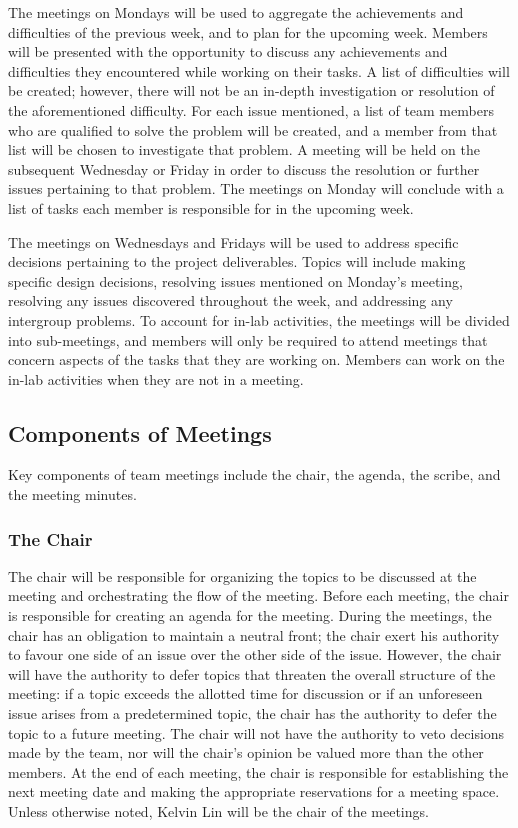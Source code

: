 \documentclass{article}
\begin{document}
The meetings on Mondays will be used to aggregate the achievements and 
difficulties of the previous week, and to plan for the upcoming week. Members 
will be presented with the opportunity to discuss any achievements and 
difficulties they encountered while working on their tasks. A list of 
difficulties 
will be created; however, there will not be an in-depth investigation or 
resolution of the aforementioned difficulty. For each issue mentioned, a list of 
team members who are qualified to solve the problem will be created, and a 
member from that list will be chosen to investigate that problem. A meeting will 
be held on the subsequent Wednesday or Friday in order to discuss the resolution 
or further issues pertaining to that problem. The meetings on Monday will 
conclude with a list of tasks each member is responsible for in the upcoming 
week.

The meetings on Wednesdays and Fridays will be used to address specific 
decisions pertaining to the project deliverables. Topics will include making 
specific design decisions, resolving issues mentioned on Monday's meeting, 
resolving any issues discovered throughout the week, and addressing any 
intergroup problems. To account for in-lab activities, the meetings will be 
divided into sub-meetings, and members will only be required to attend meetings 
that concern aspects of the tasks that they are working on. Members can work on 
the in-lab activities when they are not in a meeting. 

\subsection{Components of Meetings}
Key components of team meetings include the chair, the agenda, the scribe, and 
the meeting minutes.

\subsubsection{The Chair}
The chair will be responsible for organizing the topics to be discussed at the 
meeting and orchestrating the flow of the meeting. Before each meeting, the 
chair is responsible for creating an agenda for the meeting. During the 
meetings, the chair has an obligation to maintain a neutral front; the chair 
exert his authority to favour one side of an issue over the other side of the 
issue. However, the chair will have the authority to defer topics that threaten 
the overall structure of the meeting: if a topic exceeds the allotted time for 
discussion or if an unforeseen issue arises from a predetermined topic, the 
chair has the authority to defer the topic to a future meeting. The chair will 
not have the authority to veto decisions made by the team, nor will the chair's 
opinion be valued more than the other members. At the end of each meeting, the 
chair is responsible for establishing the next meeting date and making the 
appropriate reservations for a meeting space. Unless otherwise noted, Kelvin Lin 
will be the chair of the meetings.
\end{document}
